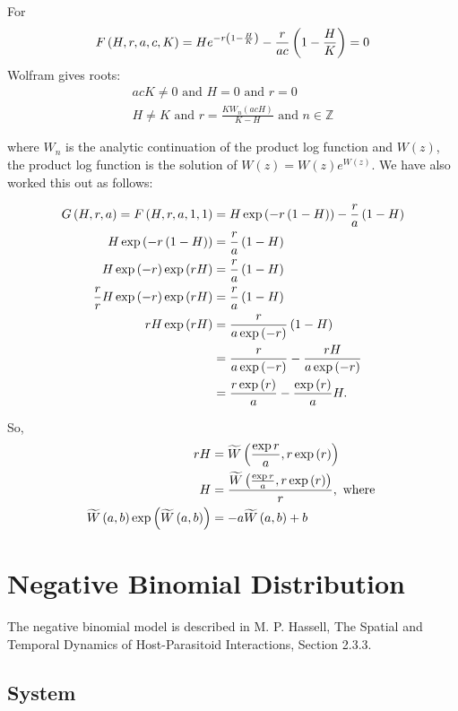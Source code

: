 \documentclass{article}
\begin{document}
For
\begin{align*}
F\left(H, r, a, c, K\right) = H e^{-r\left(1-\frac{H}{K}\right)} - \frac{r}{ac} \left(1-\frac{H}{K}\right) = 0
\end{align*}
Wolfram gives roots:
\begin{align*}
    acK \ne 0 \text{ and } H=0 \text{ and } r=0\\
    H \ne K \text{ and } r = \frac{KW_n(acH)}{K-H} \text{ and } n \in \mathbb{Z}
\end{align*}

where $W_n$ is the analytic continuation of the product log function and $W(z)$, the product log function is the solution of $W(z) = W(z) e^{W(z)}$. We have also worked this out as follows:

\begin{align*}
    G\left(H, r, a\right) = F\left(H, r, a, 1, 1\right) &= H \exp{\left(-r\left(1 - H\right)\right)} - \frac{r}{a}\left(1-H\right)\\
    H\exp{\left(-r\left(1-H\right)\right)}                    &= \frac{r}{a} \left(1-H\right)\\
    H\exp{\left(-r\right)}\exp{\left(rH\right)}               &= \frac{r}{a}\left(1-H\right)\\
    \frac{r}{r} H \exp{\left(-r\right)} \exp{\left(rH\right)} &= \frac{r}{a}\left(1-H\right)\\
    rH\exp{\left(rH\right)} &= \frac{r}{a\exp{\left(-r\right)}} \left(1-H\right)\\
                    &= \frac{r}{a\exp{\left(-r\right)}} - \frac{rH}{a\exp{\left(-r\right)}}\\
                    &= \frac{r\exp{\left(r\right)}}{a} - \frac{\exp{\left(r\right)}}{a} H.
\end{align*}

So,
\begin{align*}
    rH &= \widetilde{W}\left(\frac{\exp{r}}{a}, r \exp{\left(r\right)}\right)\\
    H &= \frac{\widetilde{W}\left(\frac{\exp{r}}{a}, r \exp{\left(r\right)}\right)}{r}, \text{ where }\\
    \widetilde{W}\left(a,b\right)\exp{\left(\widetilde{W}\left(a,b\right)\right)} &= -a \widetilde{W}\left(a,b\right) + b
\end{align*}


\pagebreak
\section{Negative Binomial Distribution}
The negative binomial model is described in M. P. Hassell, The Spatial and Temporal Dynamics of Host-Parasitoid Interactions, Section 2.3.3.

\subsection{System}
\end{document}
